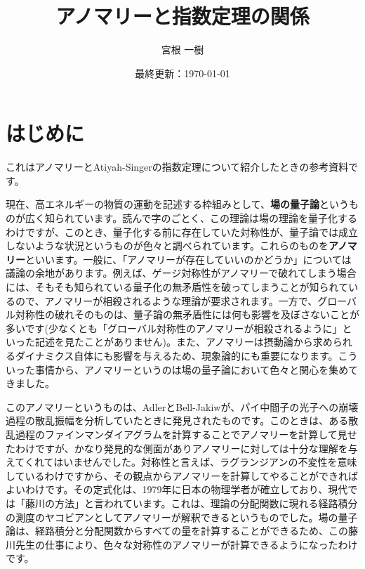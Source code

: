 \documentclass[unicode,a4paper,10pt]{ltjsarticle}
\begin{document}
\title{
  アノマリーと指数定理の関係
}
\author{
  宮根 一樹
}
\date{最終更新：\today}

\maketitle
\tableofcontents

\section{はじめに}

これはアノマリーとAtiyah-Singerの指数定理について紹介したときの参考資料です。

現在、高エネルギーの物質の運動を記述する枠組みとして、\textbf{場の量子論}というものが広く知られています。読んで字のごとく、この理論は場の理論を量子化するわけですが、このとき、量子化する前に存在していた対称性が、量子論では成立しないような状況というものが色々と調べられています。これらのものを\textbf{アノマリー}といいます。一般に、「アノマリーが存在していいのかどうか」については議論の余地があります。例えば、ゲージ対称性がアノマリーで破れてしまう場合には、そもそも知られている量子化の無矛盾性を破ってしまうことが知られているので、アノマリーが相殺されるような理論が要求されます。一方で、グローバル対称性の破れそのものは、量子論の無矛盾性には何も影響を及ぼさないことが多いです(少なくとも「グローバル対称性のアノマリーが相殺されるように」といった記述を見たことがありません)。また、アノマリーは摂動論から求められるダイナミクス自体にも影響を与えるため、現象論的にも重要になります。こういった事情から、アノマリーというのは場の量子論において色々と関心を集めてきました。

このアノマリーというものは、Adler\cite{Adler:1969gk}とBell-Jakiw\cite{Bell:1969ts}が、パイ中間子の光子への崩壊過程の散乱振幅を分析していたときに発見されたものです。このときは、ある散乱過程のファインマンダイアグラムを計算することでアノマリーを計算して見せたわけですが、かなり発見的な側面がありアノマリーに対しては十分な理解を与えてくれてはいませんでした。対称性と言えば、ラグランジアンの不変性を意味しているわけですから、その観点からアノマリーを計算してやることができればよいわけです。その定式化は、1979年に日本の物理学者が確立しており、現代では「藤川の方法」と言われています\cite{Fujikawa:1979ay}。これは、理論の分配関数に現れる経路積分の測度のヤコビアンとしてアノマリーが解釈できるというものでした。場の量子論は、経路積分と分配関数からすべての量を計算することができるため、この藤川先生の仕事により、色々な対称性のアノマリーが計算できるようになったわけです。
\end{document}
